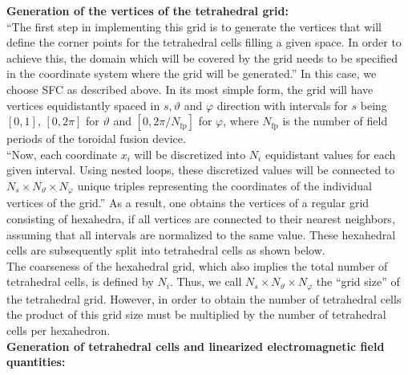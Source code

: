 \documentclass{TheMartianReport}
\begin{document}
\textbf{Generation of the vertices of the tetrahedral grid:}\\
``The first step in implementing this grid is to generate the vertices that will define the corner points for the tetrahedral cells filling a given space. In order to achieve this, the domain which will be covered by the grid needs to be specified in the coordinate system where the grid will be generated.''\cite{bauer_master_2020} In this case, we choose SFC as described above. In its most simple form, the grid will have vertices equidistantly spaced in $s,\vartheta$ and $\varphi$ direction with intervals for $s$ being $[0,1]$, $[0,2\pi]$ for $\vartheta$ and $[0,2\pi/N_\text{fp}]$ for $\varphi$, where $N_\text{fp}$ is the number of field periods of the toroidal fusion device. \\
%
``Now, each coordinate $x_i$ will be discretized into $N_i$ equidistant values for each given interval. Using nested loops, these discretized values will be connected to $N_s\times N_\vartheta \times N_\varphi$ unique triples representing the coordinates of the individual vertices of the grid.''\cite{bauer_master_2020} As a result, one obtains the vertices of a regular grid consisting of hexahedra, if all vertices are connected to their nearest neighbors, assuming that all intervals are normalized to the same value. These hexahedral cells are subsequently split into tetrahedral cells as shown below.\\
%
The coarseness of the hexahedral grid, which also implies the total number of tetrahedral cells, is defined by $N_i$. Thus, we call $N_s\times N_\vartheta \times N_\varphi$ the ``grid size'' of the tetrahedral grid. However, in order to obtain the number of tetrahedral cells the product of this grid size must be multiplied by the number of tetrahedral cells per hexahedron.\\



\textbf{Generation of tetrahedral cells and linearized electromagnetic field quantities:}
\end{document}
